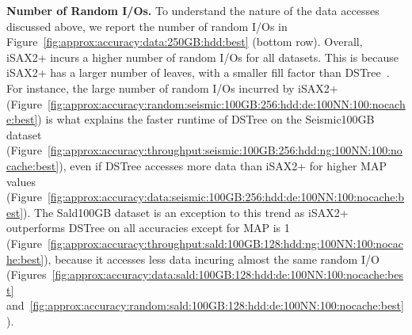 {{\noindent\textbf{Number of Random I/Os.} 
To understand the nature of the data accesses discussed above, we report the number of random I/Os in Figure~\ref{fig:approx:accuracy:data:250GB:hdd:best} (bottom row). 
Overall, iSAX2+ incurs a higher number of random I/Os for all datasets. 
This is because iSAX2+ has a larger number of leaves, with a smaller fill factor than DSTree~\cite{journal/pvldb/echihabi2018}. 
For instance, the large number of random I/Os incurred by iSAX2+ (Figure~\ref{fig:approx:accuracy:random:seismic:100GB:256:hdd:de:100NN:100:nocache:best}) is what explains the faster runtime of DSTree on the Seismic100GB dataset (Figure~\ref{fig:approx:accuracy:throughput:seismic:100GB:256:hdd:ng:100NN:100:nocache:best}), even if DSTree accesses more data than iSAX2+ for higher MAP values (Figure~\ref{fig:approx:accuracy:data:seismic:100GB:256:hdd:de:100NN:100:nocache:best}). 
The Sald100GB dataset is an exception to this trend 
as iSAX2+ outperforms DSTree on all accuracies except for MAP is 1 (Figure~\ref{fig:approx:accuracy:throughput:sald:100GB:128:hdd:ng:100NN:100:nocache:best}), because it accesses less data incuring almost the same random I/O (Figures~\ref{fig:approx:accuracy:data:sald:100GB:128:hdd:de:100NN:100:nocache:best} and~\ref{fig:approx:accuracy:random:sald:100GB:128:hdd:de:100NN:100:nocache:best}).
\begin{comment}
\begin{figure*}[!htb]
	\captionsetup{justification=centering}
	\captionsetup[subfigure]{justification=centering}
	\begin{subfigure}{\textwidth}
		\centering
		\texttt{[image: \{full\_epsilon\_legend\_new]}}\\
	\end{subfigure}	
	\begin{subfigure}{0.19\textwidth}
		\centering
		\caption{Rand250GB} 
		\label{fig:approx:accuracy:random:synthetic:250GB:256:hdd:de:100NN:100:nocache}
	\end{subfigure}
	\begin{subfigure}{0.19\textwidth}
		\centering
		\texttt{[image: exact\_mapk\_random\_sald\_100GB\_128\_de\_100NN\_100\_nocache]}
		\caption{Sald100GB} 
		\label{fig:approx:accuracy:random:sald:100GB:128:hdd:de:100NN:100:nocache}
	\end{subfigure}
	\begin{subfigure}{0.19\textwidth}

\end{comment}}}
